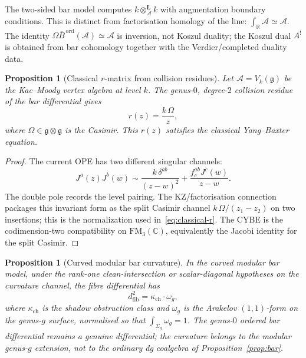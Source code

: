 \documentclass[11pt]{article}
\newtheorem{proposition}[theorem]{Proposition}
\theoremstyle{remark}
\providecommand{\cA}{\mathcal{A}}
\providecommand{\bC}{\mathbb{C}}
\providecommand{\bR}{\mathbb{R}}
\providecommand{\fg}{\mathfrak{g}}
\providecommand{\Bord}{\overline{B}^{\,\mathrm{ord}}}
\begin{document}
The two-sided bar model computes
$k \otimes_\cA^{\mathbf{L}} k$ with augmentation boundary conditions.
This is distinct from factorisation homology of the line:
$\int_\bR \cA \simeq \cA$.  The identity
$\Omega\Bord(\cA)\simeq \cA$ is inversion, not Koszul duality; the
Koszul dual $A^!$ is obtained from bar cohomology together with the
Verdier/completed duality data.

\begin{proposition}[Classical $r$-matrix from collision residues]
\label{prop:r-classical}
Let $\cA = V_k(\fg)$ be the Kac--Moody vertex algebra at level $k$.
The genus-$0$, degree-$2$ collision residue of the bar differential gives
\begin{equation}\label{eq:classical-r}
r(z) = \frac{k\,\Omega}{z},
\end{equation}
where $\Omega \in \fg \otimes \fg$ is the Casimir.  This $r(z)$
satisfies the classical Yang--Baxter equation.
\end{proposition}

\begin{proof}
The current OPE has two different singular channels:
\[
J^a(z)J^b(w)\sim
\frac{k\,\delta^{ab}}{(z-w)^2}
+\frac{f^{ab}_{c}J^c(w)}{z-w}.
\]
The double pole records the level pairing.  The KZ/factorisation
connection packages this invariant form as the split Casimir channel
$k\,\Omega/(z_1-z_2)$ on two insertions; this is the normalization used
in~\eqref{eq:classical-r}.  The CYBE is the codimension-two
compatibility on $\mathrm{FM}_3(\bC)$, equivalently the Jacobi identity
for the split Casimir.
\end{proof}

\begin{proposition}[Curved modular bar curvature]\label{prop:curvature}
In the curved modular bar model, under the rank-one clean-intersection
or scalar-diagonal hypotheses on the curvature channel, the fibre
differential has
\begin{equation}\label{eq:curvature}
d_{\mathrm{fib}}^2 = \kappa_{\mathrm{ch}} \cdot \omega_g,
\end{equation}
where $\kappa_{\mathrm{ch}}$ is the shadow obstruction class and
$\omega_g$ is the Arakelov $(1,1)$-form on the genus-$g$ surface,
normalised so that $\int_{\Sigma_g} \omega_g = 1$.
The genus-$0$ ordered bar differential remains a genuine differential;
the curvature belongs to the modular genus-$g$ extension, not to the
ordinary dg coalgebra of Proposition~\ref{prop:bar}.
\end{proposition}
\end{document}
